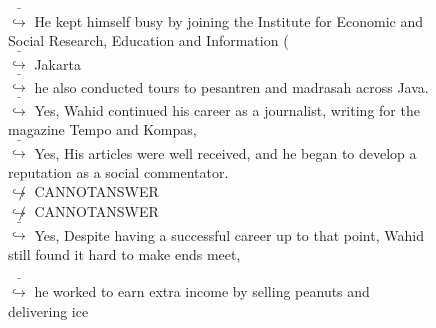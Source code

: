 \documentclass[11pt,a4paper, onecolumn]{article}
\begin{document}
\begin{figure}[t] \small \begin{tcolorbox}[boxsep=0pt,left=5pt,right=0pt,top=2pt,colback = yellow!5] \begin{dialogue}
 \small 
\colorbox{pink!25}{ $\bar{\hookrightarrow}$}
{ He kept himself busy by joining the Institute for Economic and Social Research, Education and Information ( }
\\
\colorbox{pink!25}{ $\bar{\hookrightarrow}$}
{ Jakarta }
\\
\colorbox{pink!25}{ $\bar{\hookrightarrow}$}
{ he also conducted tours to pesantren and madrasah across Java. }
\\
\colorbox{pink!25}{ $\bar{\hookrightarrow}$}
\colorbox{red!25}{Yes,}
{ Wahid continued his career as a journalist, writing for the magazine Tempo and Kompas, }
\\
\colorbox{pink!25}{ $\bar{\hookrightarrow}$}
\colorbox{red!25}{Yes,}
{ His articles were well received, and he began to develop a reputation as a social commentator. }
\\
\colorbox{pink!25}{$\not\hookrightarrow$}
{ CANNOTANSWER }
\\
\colorbox{pink!25}{$\not\hookrightarrow$}
{ CANNOTANSWER }
\\
\colorbox{pink!25}{ $\bar{\hookrightarrow}$}
\colorbox{red!25}{Yes,}
{ Despite having a successful career up to that point, Wahid still found it hard to make ends meet, }
 \end{dialogue}\end{tcolorbox}\end{figure}\begin{figure}[t] \small \begin{tcolorbox}[boxsep=0pt,left=5pt,right=0pt,top=2pt,colback = yellow!5] \begin{dialogue}
 \small 
\colorbox{pink!25}{ $\bar{\hookrightarrow}$}
{ he worked to earn extra income by selling peanuts and delivering ice }
\\
 \end{dialogue}\end{tcolorbox}\end{figure}
\end{document}

